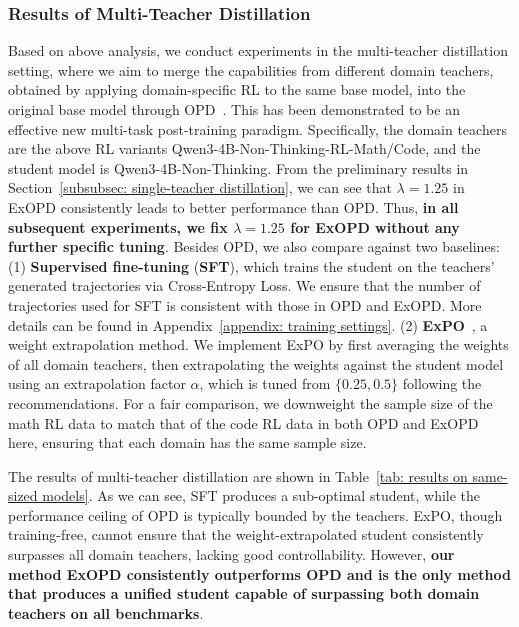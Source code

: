 \documentclass{article} %
\begin{document}




\subsubsection{Results of Multi-Teacher Distillation}
\label{subsubsec: multi-teacher distillation}
Based on above analysis, we conduct experiments in the multi-teacher distillation setting, where we aim to merge the capabilities from different domain teachers, obtained by applying domain-specific RL to the same base model, into the original base model through OPD~\citep{mimo}. This has been demonstrated to be an effective new multi-task post-training paradigm. Specifically, the domain teachers are the above RL variants Qwen3-4B-Non-Thinking-RL-Math/Code, and the student model is Qwen3-4B-Non-Thinking. From the preliminary results in Section~\ref{subsubsec: single-teacher distillation}, we can see that $\lambda=1.25$ in ExOPD consistently leads to better performance than OPD. Thus, \textbf{in all subsequent experiments, we fix $\lambda = 1.25$ for ExOPD without any further specific tuning}. 
Besides OPD, we also compare against two baselines: (1) \textbf{Supervised fine-tuning} (\textbf{SFT}), which trains the student on the teachers' generated trajectories via Cross-Entropy Loss. We ensure that the number of trajectories used for SFT is consistent with those in OPD and ExOPD. More details can be found in Appendix~\ref{appendix: training settings}. (2) \textbf{ExPO}~\citep{expo}, a weight extrapolation method. We implement ExPO by first averaging the weights of all domain teachers, then extrapolating the weights against the student model using an extrapolation factor $\alpha$, which is tuned from $\{0.25, 0.5\}$ following the recommendations. For a fair comparison, we downweight the sample size of the math RL data to match that of the code RL data in both OPD and ExOPD here, ensuring that each domain has the same sample size.



The results of multi-teacher distillation are shown in Table~\ref{tab: results on same-sized models}. As we can see, SFT produces a sub-optimal student, while the performance ceiling of OPD is typically bounded by the teachers. ExPO, though training-free, cannot ensure that the weight-extrapolated student consistently surpasses all domain teachers, lacking good controllability. 
However, \textbf{our method ExOPD consistently outperforms OPD and is the only method that produces a unified student capable of surpassing both domain teachers on all benchmarks}. 
\end{document}
